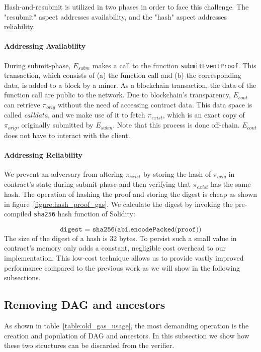 Hash-and-resubmit is utilized in two phases in order to face this challenge.
The "resubmit" aspect addresses availability, and the "hash" aspect addresses
reliability.

\paragraph{Addressing Availability}

During submit-phase, $E_{subm}$ makes a call to the function
\texttt{submitEventProof}. This transaction, which consists of (a) the function
call and (b) the corresponding data, is added to a block by a miner. As a
blockchain transaction, the data of the function call are public to the
network. Due to blockchain's transparency, $E_{cont}$ can retrieve
$\pi_{orig}$ without the need of accessing contract data. This data space is
called \emph{calldata}, and we make use of it to fetch $\pi_{exist}$, which is
an exact copy of $\pi_{orig}$, originally submitted by $E_{subm}$. Note that
this process is done off-chain. $E_{cont}$ does not have to interact with the
client.

\paragraph{Addressing Reliability}

We prevent an adversary from altering $\pi_{exist}$ by storing the hash of
$\pi_{orig}$ in contract's state during submit phase and then verifying that
$\pi_{exist}$ has the same hash. The operation of hashing the proof and storing
the digest is cheap as shown in figure~\ref{figure:hash_proof_gas}. We
calculate the digest by invoking the pre-compiled \texttt{sha256} hash function
of Solidity:

\[\texttt{digest = sha256(abi.encodePacked(proof))}\] The size of the digest of
a hash is 32 bytes. To persist such a small value in contract's memory only
adds a constant, negligible cost overhead to our implementation. This low-cost
technique allows us to provide vastly improved performance compared to the
previous work as we will show in the following subsections.



\subsection{Removing DAG and ancestors}

As shown in table~\ref{table:old_gas_usage}, the most demanding operation is
the creation and population of DAG and ancestors. In this subsection we show
how these two structures can be discarded from the verifier.


